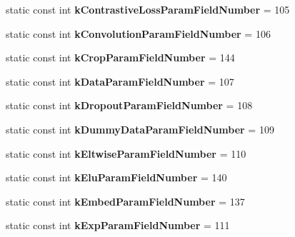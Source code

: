 \begin{DoxyCompactItemize}
static const int {\bfseries k\+Contrastive\+Loss\+Param\+Field\+Number} = 105
\item 
\mbox{\label{classcaffe_1_1_layer_parameter_a1337374ed24900cc35d64f7e890175fd}} 
static const int {\bfseries k\+Convolution\+Param\+Field\+Number} = 106
\item 
\mbox{\label{classcaffe_1_1_layer_parameter_a9410a4cac64c1c703300a1c2a2f772e7}} 
static const int {\bfseries k\+Crop\+Param\+Field\+Number} = 144
\item 
\mbox{\label{classcaffe_1_1_layer_parameter_a30d7582ae7d9d3148254876cf1a97e52}} 
static const int {\bfseries k\+Data\+Param\+Field\+Number} = 107
\item 
\mbox{\label{classcaffe_1_1_layer_parameter_ab4affada9846aacb5fbf29312c91cff3}} 
static const int {\bfseries k\+Dropout\+Param\+Field\+Number} = 108
\item 
\mbox{\label{classcaffe_1_1_layer_parameter_a03651252b315960fd69e32c9cd4091bc}} 
static const int {\bfseries k\+Dummy\+Data\+Param\+Field\+Number} = 109
\item 
\mbox{\label{classcaffe_1_1_layer_parameter_ae6b1cfa45cc2c71a3f248c0655f5332e}} 
static const int {\bfseries k\+Eltwise\+Param\+Field\+Number} = 110
\item 
\mbox{\label{classcaffe_1_1_layer_parameter_a10724362b5bebe1de051909ef3612860}} 
static const int {\bfseries k\+Elu\+Param\+Field\+Number} = 140
\item 
\mbox{\label{classcaffe_1_1_layer_parameter_ad856d37189af8e97f616010e26a6383f}} 
static const int {\bfseries k\+Embed\+Param\+Field\+Number} = 137
\item 
\mbox{\label{classcaffe_1_1_layer_parameter_af59d2469b55d6db398d05a030031bb1a}} 
static const int {\bfseries k\+Exp\+Param\+Field\+Number} = 111
\item 
\mbox{\label{classcaffe_1_1_layer_parameter_a25214772e6fdb25ea22fd25b1a5857ec}} 

\end{DoxyCompactItemize}
